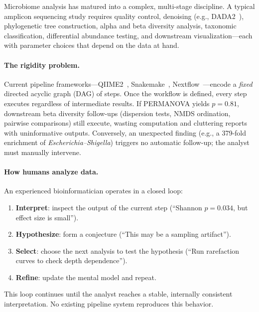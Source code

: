 \documentclass[11pt,a4paper]{article}
\begin{document}
Microbiome analysis has matured into a complex, multi-stage discipline.
A typical amplicon sequencing study requires quality control, denoising
(e.g., DADA2~\citep{callahan2016}), phylogenetic tree construction,
alpha and beta diversity analysis, taxonomic classification, differential
abundance testing, and downstream visualization---each with parameter
choices that depend on the data at hand.

\paragraph{The rigidity problem.}
Current pipeline frameworks---QIIME2~\citep{qiime2},
Snakemake~\citep{snakemake}, Nextflow~\citep{nextflow}---encode a
\emph{fixed} directed acyclic graph (DAG) of steps.
Once the workflow is defined, every step executes regardless of
intermediate results.
If PERMANOVA yields $p = 0.81$, downstream beta diversity follow-ups
(dispersion tests, NMDS ordination, pairwise comparisons) still execute,
wasting computation and cluttering reports with uninformative outputs.
Conversely, an unexpected finding (e.g., a 379-fold enrichment of
\emph{Escherichia--Shigella}) triggers no automatic follow-up;
the analyst must manually intervene.

\paragraph{How humans analyze data.}
An experienced bioinformatician operates in a closed loop:
\begin{enumerate}
  \item \textbf{Interpret}: inspect the output of the current step
        (``Shannon $p = 0.034$, but effect size is small'').
  \item \textbf{Hypothesize}: form a conjecture
        (``This may be a sampling artifact'').
  \item \textbf{Select}: choose the next analysis to test the hypothesis
        (``Run rarefaction curves to check depth dependence'').
  \item \textbf{Refine}: update the mental model and repeat.
\end{enumerate}
This loop continues until the analyst reaches a stable, internally
consistent interpretation.
No existing pipeline system reproduces this behavior.
\end{document}
